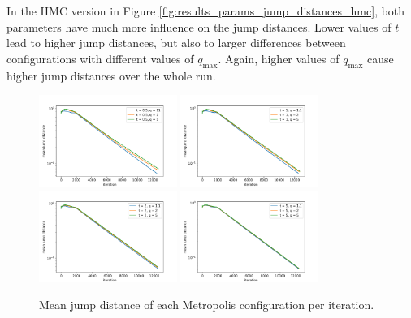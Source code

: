 \documentclass[12pt, a4paper]{report}
\begin{document}
In the HMC version in Figure \ref{fig:results_params_jump_distances_hmc}, both parameters have much more influence on the jump distances.
Lower values of $t$ lead to higher jump distances, but also to larger differences between configurations with different values of $q_{\textrm{max}}$.
Again, higher values of  $q_{\textrm{max}}$ cause higher jump distances over the whole run.
\begin{figure}
    \centering
    \includegraphics[width=0.4\textwidth]{figs/results/params/jump_distances_metropolis_t_05}
    \includegraphics[width=0.4\textwidth]{figs/results/params/jump_distances_metropolis_t_1}
    \includegraphics[width=0.4\textwidth]{figs/results/params/jump_distances_metropolis_t_2}
    \includegraphics[width=0.4\textwidth]{figs/results/params/jump_distances_metropolis_t_5}
    \caption{Mean jump distance of each Metropolis configuration per iteration.}
    \label{fig:results_params_jump_distances_metropolis}
\end{figure}
\end{document}
